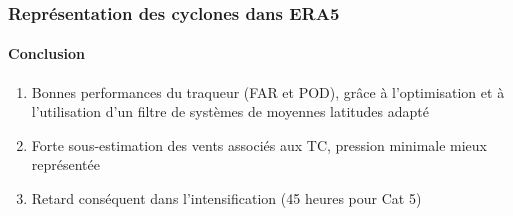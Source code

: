 \documentclass[aspectratio=169, usepdftitle=false, xcolor={dvipsnames}, 9pt,table]{beamer}
\begin{document}
\begin{frame}[c]
    \frametitle{Représentation des cyclones dans ERA5}
    \framesubtitle{Conclusion}
    \begin{block}
        \small
        \begin{enumerate}
            \setlength\itemsep{1em}
            \item<1-> \alert{Bonnes performances} du traqueur (FAR et POD), grâce à l'optimisation et à l'utilisation d'un filtre de systèmes de
                moyennes latitudes adapté
            \item<2-> Forte \alert{sous-estimation} des vents associés aux TC, pression minimale mieux représentée
            \item<3-> \alert{Retard} conséquent dans l'intensification (45 heures pour Cat 5)
        \end{enumerate}
        \vspace{1em}
    \end{block}
\end{frame}

\end{document}
